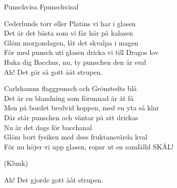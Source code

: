 \begin{song}{Punschvisa F}{punschvisaf}
\begin{vers}
Cederlunds torr eller Platins vi har i glasen\\
Det är det bästa som vi får här på kalasen\\
Glöm morgondagen, låt det skvalpa i magen\\
För med punsch uti glasen dricka vi till Dragos lov\\
Huka dig Bacchus, nu, ty punschen den är sval\\
Ah! Det gör så gott ååt strupen.
\end{vers}
\begin{vers}
Carlshamns flaggpunsch och Grönstedts blå\\
Det är en blandning som förunnad är åt få\\
Men på bordet bredvid koppen, med en yta så klar\\
Där står punschen och väntar på att drickas\\
Nu är det dags för bacchanal\\
Glöm bort fysiken med dess fruktansvärda kval\\
För nu höjer vi upp glasen, ropar ut en samfälld SKÅL!\\
\end{vers}
\begin{vers}
(Klunk)
\end{vers}
\begin{vers}
Ah! Det gjorde gott ååt strupen.
\end{vers}
\end{song}
